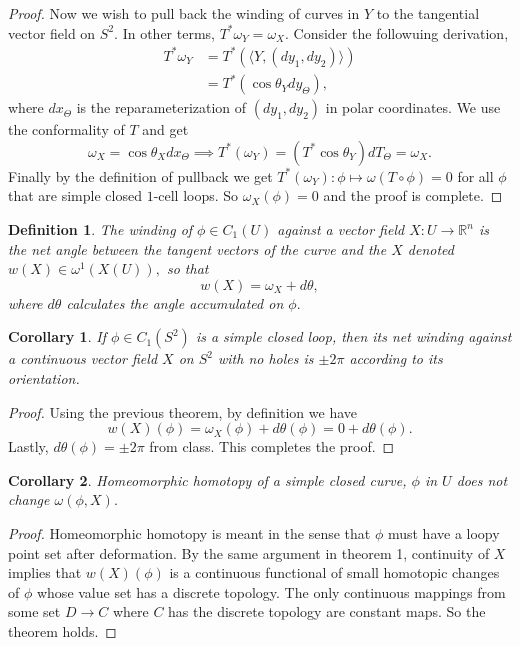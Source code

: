 \documentclass[letter]{article}
\newtheorem{definition}{Definition}
\newtheorem{corollary}{Corollary}
\newenvironment{menumerate}{%
  \edef\backupindent{\the\parindent}%
  \enumerate%
  \setlength{\parindent}{\backupindent}%
}{\endenumerate}
\begin{document}
\begin{menumerate}
\begin{menumerate}
\begin{proof}
			 Now we wish to pull back the winding of curves in $Y$ to the tangential vector field on $S^2.$ In other terms, $T^*\omega_Y = \omega_X.$
			 Consider the followuing derivation,
			 \begin{equation}
			 	\begin{aligned}
			 		T^*\omega_Y &= T^*(\langle Y, (dy_1, dy_2)\rangle) \\
			 		&= T^*(\cos \theta_Y dy_\Theta),
			 	\end{aligned}
			 \end{equation}
			 where $dx_\Theta$ is the reparameterization of $(dy_1, dy_2)$ in polar coordinates. We use the conformality of
			 $T$ and get
			 \begin{equation}
			 	\omega_X = \cos \theta_X dx_\Theta \implies T^*(\omega_Y) = (T^* \cos \theta_Y) dT_\Theta = \omega_X. 
			 \end{equation}
			 Finally by the definition of pullback we get $T^*(\omega_Y): \phi \mapsto \omega(T\circ \phi) = 0 $ for all $ \phi$ 
			 that are simple closed $1$-cell loops. So $\omega_X(\phi) = 0$ and the proof is complete.
		\end{proof}
		\begin{definition}
			The winding of $\phi \in C_1(U)$ against a vector field 
			$X: U \to \mathbb{R}^n$ is the net angle between the tangent vectors of the curve and 
			the $X$ denoted $w(X) \in \omega^1(X(U)),$ so that
			\begin{equation}
				w(X) = \omega_X + d\theta,
			\end{equation}
			where $d \theta$ calculates the angle accumulated on $\phi.$
		\end{definition}
		\begin{corollary}
			If $\phi \in C_1(S^2)$ is a simple closed loop, then its net winding against a continuous vector field $X$
			on $S^2$ with no holes is $\pm 2\pi$ according to its orientation. 
		\end{corollary}
		\begin{proof}
			Using the previous theorem, by definition we have
			\begin{equation}
				w(X)(\phi) = \omega_X(\phi) + d\theta(\phi) = 0 + d\theta(\phi).
			\end{equation}
			Lastly, $d\theta(\phi) = \pm2\pi$ from class. This completes the proof.
		\end{proof}
		\begin{corollary}
			Homeomorphic homotopy of a simple closed curve, $\phi$ in $U$ does not change $\omega(\phi, X).$
 		\end{corollary}
 		\begin{proof}
 			Homeomorphic homotopy is meant in the sense that $\phi$ must have a loopy point set after deformation. 
 			By the same argument in theorem 1, continuity of $X$ implies that $w(X)(\phi)$ is a continuous functional
 			of small homotopic changes of $\phi$ whose value set has a discrete topology. The only continuous mappings
 			from some set $D \to C$ where $C$ has the discrete topology are constant maps. So the theorem holds.
 		\end{proof}


\end{menumerate}
\end{menumerate}
\end{document}
